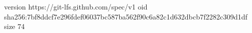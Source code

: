 version https://git-lfs.github.com/spec/v1
oid sha256:7bf8ddcf7e296fdef06037bc587ba562f90c6a82c1d632dbcb7f2282c309d1df
size 74
